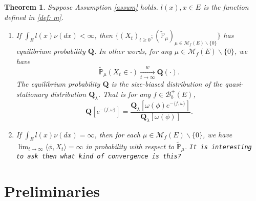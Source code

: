 \documentclass[12pt,a4paper]{amsart}
\numberwithin{equation}{section}
\theoremstyle{plain}
\newtheorem{thm}{Theorem}[section]
\theoremstyle{definition}
\theoremstyle{remark}
\begin{document}
\begin{thm}\label{thm: structure of Qprocess}
	Suppose Assumption \ref{assum} holds. $l(x), x\in E$ is the function defined in \eqref{def: m}.
\begin{enumerate}
\item
	If $\int_E l(x)\nu(dx)<\infty$, then $\{(X_t)_{t\geq 0};(\widetilde{\mathbb P}_\mu)_{\mu\in\mathcal M_f(E)\backslash\{0\}}\}$ has equilibrium probability ${\mathbf Q}$. In other words, for any $\mu\in\mathcal M_f(E)\backslash\{0\}$, we have
\[
	\widetilde{\mathbb P}_\mu(X_t \in \cdot ) \xrightarrow[t\to \infty]{w} {\mathbf Q}(\cdot).
\]
The equilibrium probability $\mathbf Q$ is the size-biased distribution of the quasi-stationary distribution $\mathbf Q_\lambda$. That is for any $f\in\mathcal B_b^+(E)$,
\[
  	\mathbf Q\left[e^{-\langle f,\omega\rangle}\right] = \dfrac{\mathbf Q_\lambda\left[\omega(\phi)e^{-\langle f,\omega\rangle}\right]}{\mathbf Q_\lambda[\omega(\phi)]}.
\]
\item
	If $\int_El(x)\nu(dx)=\infty$, then for each $\mu \in \mathcal M_f(E)\backslash\{0\}$, we have $\lim_{t\rightarrow\infty}\langle \phi, X_t\rangle =\infty$ in probability with respect to $\widetilde{\mathbb P}_\mu$. {\tt It is interesting to ask then what kind of convergence is this?}
\end{enumerate}
\end{thm}


\section{Preliminaries}
\end{document}
